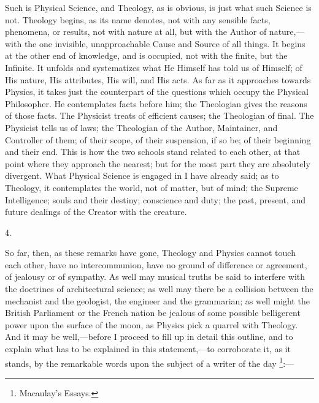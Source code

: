 Such is Physical Science, and Theology, as is obvious, is just what
such Science is not. Theology begins, as its name denotes, not with
any sensible facts, phenomena, or results, not with nature at all, but
with the Author of nature,—with the one invisible, unapproachable
Cause and Source of all things. It begins at the other end of
knowledge, and is occupied, not with the finite, but the Infinite. It
unfolds and systematizes what He Himself has told us of Himself; of
His nature, His attributes, His will, and His acts. As far as it
approaches towards Physics, it takes just the counterpart of the
questions which occupy the Physical Philosopher. He contemplates facts
before him; the Theologian gives the reasons of those facts. The
Physicist treats of efficient causes; the Theologian of final. The
Physicist tells us of laws; the Theologian of the Author, Maintainer,
and Controller of them; of their scope, of their suspension, if so be;
of their beginning and their end. This is how the two schools stand
related to each other, at that point where they approach the nearest;
but for the most part they are absolutely divergent. What Physical
Science is engaged in I have already said; as to Theology, it
contemplates the world, not of matter, but of mind; the Supreme
Intelligence; souls and their destiny; conscience and duty; the past,
present, and future dealings of the Creator with the creature.

4.

So far, then, as these remarks have gone, Theology and Physics
cannot touch each other, have no intercommunion, have no ground of
difference or agreement, of jealousy or of sympathy. As well may
musical truths be said to interfere with the doctrines of
architectural science; as well may there be a collision between the
mechanist and the geologist, the engineer and the grammarian; as well
might the British Parliament or the French nation be jealous of some
possible belligerent power upon the surface of the moon, as Physics
pick a quarrel with Theology. And it may be well,—before I proceed
to fill up in detail this outline, and to explain what has to be
explained in this statement,—to corroborate it, as it stands, by the
remarkable words upon the subject of a writer of the day \footnote{Macaulay's
Essays.}:—

